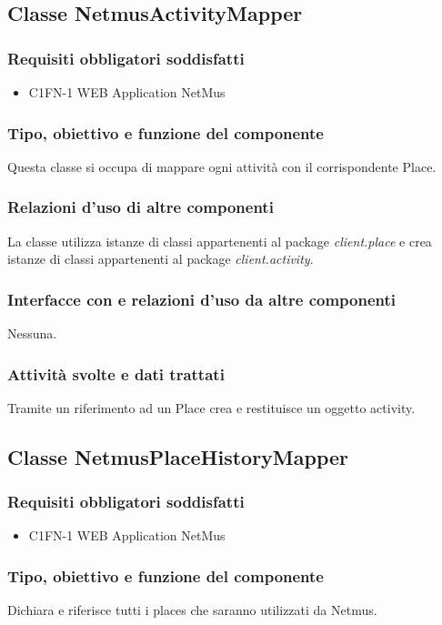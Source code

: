 \subsection{Classe NetmusActivityMapper}
\subsubsection*{Requisiti obbligatori soddisfatti}
\begin{itemize}
	\item C1FN-1 WEB Application NetMus
\end{itemize}
\subsubsection*{Tipo, obiettivo e funzione del componente}
Questa classe si occupa di mappare ogni attivit\`a con il corrispondente Place.
\subsubsection*{Relazioni d'uso di altre componenti}
La classe utilizza istanze di classi appartenenti al package
\emph{client.place} e crea istanze di classi appartenenti al package
\emph{client.activity}.
\subsubsection*{Interfacce con e relazioni d'uso da altre
componenti} Nessuna.
\subsubsection*{Attivit\`a svolte e dati trattati}
Tramite un riferimento ad un Place crea e restituisce un oggetto activity.

\subsection{Classe NetmusPlaceHistoryMapper}
\subsubsection*{Requisiti obbligatori soddisfatti}
\begin{itemize}
	\item C1FN-1 WEB Application NetMus
\end{itemize}
\subsubsection*{Tipo, obiettivo e funzione del componente}
Dichiara e riferisce tutti i places che saranno utilizzati da Netmus.
